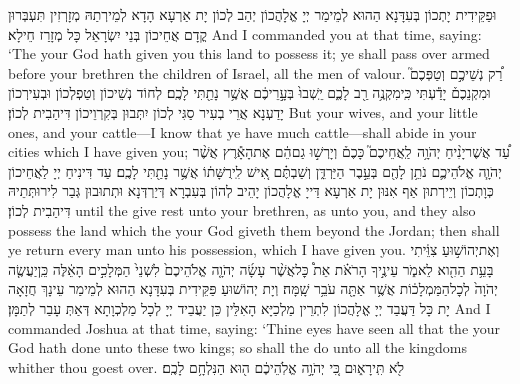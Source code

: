 {וּפַקֵּידִית יָתְכוֹן בְּעִדָּנָא הַהוּא לְמֵימַר יְיָ אֱלָהֲכוֹן יְהַב לְכוֹן יָת אַרְעָא הָדָא לְמֵירְתַהּ מְזָרְזִין תִּעְבְּרוּן קֳדָם אֲחֵיכוֹן בְּנֵי יִשְׂרָאֵל כָּל מְזָרַז חֵילָא׃}
{And I commanded you at that time, saying: ‘The \lord\space your God hath given you this land to possess it; ye shall pass over armed before your brethren the children of Israel, all the men of valour.}{}
{רַ֠ק נְשֵׁיכֶ֣ם וְטַפְּכֶם֮ וּמִקְנֵכֶם֒ יָדַ֕עְתִּי כִּֽי\maqqaf מִקְנֶ֥ה רַ֖ב לָכֶ֑ם יֵֽשְׁבוּ֙ בְּעָ֣רֵיכֶ֔ם אֲשֶׁ֥ר נָתַ֖תִּי לָכֶֽם׃}
{לְחוֹד נְשֵׁיכוֹן וְטַפְלְכוֹן וּבְעִירְכוֹן יָדַעְנָא אֲרֵי בְעִיר סַגִּי לְכוֹן יִתְּבוּן בְּקִרְוֵיכוֹן דִּיהַבִית לְכוֹן׃}
{But your wives, and your little ones, and your cattle—I know that ye have much cattle—shall abide in your cities which I have given you;}{}
{עַ֠ד אֲשֶׁר\maqqaf יָנִ֨יחַ יְהֹוָ֥ה \pasek  לַֽאֲחֵיכֶם֮ כָּכֶם֒ וְיָרְשׁ֣וּ גַם\maqqaf הֵ֔ם אֶת\maqqaf הָאָ֕רֶץ אֲשֶׁ֨ר יְהֹוָ֧ה אֱלֹהֵיכֶ֛ם נֹתֵ֥ן לָהֶ֖ם בְּעֵ֣בֶר הַיַּרְדֵּ֑ן וְשַׁבְתֶּ֗ם אִ֚ישׁ לִֽירֻשָּׁת֔וֹ אֲשֶׁ֥ר נָתַ֖תִּי לָכֶֽם׃}
{עַד דִּינִיחַ יְיָ לַאֲחֵיכוֹן כְּוָתְכוֹן וְיֵירְתוּן אַף אִנּוּן יָת אַרְעָא דַּייָ אֱלָהֲכוֹן יָהֵיב לְהוֹן בְּעִבְרָא דְּיַרְדְּנָא וּתְתוּבוּן גְּבַר לִירוּתְּתֵיהּ דִּיהַבִית לְכוֹן׃}
{until the \lord\space give rest unto your brethren, as unto you, and they also possess the land which the \lord\space your God giveth them beyond the Jordan; then shall ye return every man unto his possession, which I have given you.}{}
{וְאֶת\maqqaf יְהוֹשׁ֣וּעַ צִוֵּ֔יתִי בָּעֵ֥ת הַהִ֖וא לֵאמֹ֑ר עֵינֶ֣יךָ הָרֹאֹ֗ת אֵת֩ כׇּל\maqqaf אֲשֶׁ֨ר עָשָׂ֜ה יְהֹוָ֤ה אֱלֹהֵיכֶם֙ לִשְׁנֵי֙ הַמְּלָכִ֣ים הָאֵ֔לֶּה כֵּֽן\maqqaf יַעֲשֶׂ֤ה יְהֹוָה֙ לְכׇל\maqqaf הַמַּמְלָכ֔וֹת אֲשֶׁ֥ר אַתָּ֖ה עֹבֵ֥ר שָֽׁמָּה׃}
{וְיָת יְהוֹשׁוּעַ פַּקֵּידִית בְּעִדָּנָא הַהוּא לְמֵימַר עֵינָךְ חֲזָאָה יָת כָּל דַּעֲבַד יְיָ אֱלָהֲכוֹן לִתְרֵין מַלְכַיָּא הָאִלֵּין כֵּן יַעֲבֵיד יְיָ לְכָל מַלְכְוָתָא דְּאַתְּ עָבַר לְתַמָּן׃}
{And I commanded Joshua at that time, saying: ‘Thine eyes have seen all that the \lord\space your God hath done unto these two kings; so shall the \lord\space do unto all the kingdoms whither thou goest over.}{}
{לֹ֖א תִּֽירָא֑וּם כִּ֚י יְהֹוָ֣ה אֱלֹֽהֵיכֶ֔ם ה֖וּא הַנִּלְחָ֥ם לָכֶֽם׃ \setuma }
